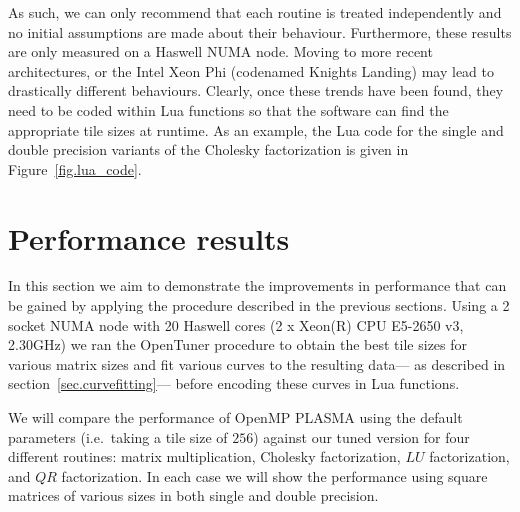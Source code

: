 \documentclass[a4paper,12pt]{article}
\begin{document}
As such,
we can only recommend that each routine is treated
independently and no initial assumptions are
made about their behaviour.
Furthermore,
these results are only measured on a Haswell NUMA node.
Moving to more recent architectures,
or the Intel Xeon Phi (codenamed Knights Landing)
may lead to drastically different behaviours.
Clearly,
once these trends have been found,
they need to be coded within Lua functions so that the
software can find the appropriate tile sizes at runtime.
As an example, the Lua code for the single and double
precision variants of the Cholesky factorization is given
in Figure~\ref{fig.lua_code}.

\section{Performance results}
\label{sec.performance}
In this section we aim to demonstrate the
improvements in performance that can be gained
by applying the procedure described in the
previous sections.
Using a 2 socket NUMA node with
20 Haswell cores (2 x Xeon(R) CPU E5-2650 v3, 2.30GHz)
we ran the OpenTuner procedure to obtain the
best tile sizes for various matrix sizes and
fit various curves to the resulting data---%
as described in section~\ref{sec.curvefitting}---%
before encoding these curves in Lua functions.

We will compare the performance of OpenMP PLASMA
using the default parameters (i\@.e\@.~taking a tile size of $256$)
against our tuned version for four different routines:
matrix multiplication, Cholesky factorization,
$LU$ factorization, and $QR$ factorization.
In each case we will show the performance using square matrices of
various sizes in both single and double precision.
\end{document}
